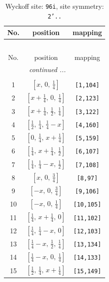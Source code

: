 \documentclass[fleqn,8pt]{jsarticle}
\begin{document}
\begin{longtable}{ccc}
\caption{Wyckoff site: {\tt 96i}, site symmetry: {\tt 2'..}}
 \\
 \hline \hline
No. & position & mapping \\ \hline \endfirsthead

\multicolumn{2}{l}{\tablename\ \thetable{}} \\
 \hline \hline
No. & position & mapping \\ \hline \endhead

 \hline \hline
\multicolumn{2}{r}{\footnotesize\it continued ...} \\ \endfoot

 \hline \hline
\multicolumn{2}{r}{} \\ \endlastfoot

1 & $\left[ x,\, 0,\, \frac{1}{4} \right]$ & {\tt [1,104]} \\ \hline
2 & $\left[ x + \frac{1}{4},\, 0,\, \frac{1}{4} \right]$ & {\tt [2,123]} \\ \hline
3 & $\left[ x + \frac{1}{4},\, \frac{1}{2},\, \frac{1}{4} \right]$ & {\tt [3,122]} \\ \hline
4 & $\left[ \frac{1}{2},\, \frac{1}{4},\, \frac{1}{4} - x \right]$ & {\tt [4,160]} \\ \hline
5 & $\left[ 0,\, \frac{1}{4},\, x + \frac{1}{4} \right]$ & {\tt [5,159]} \\ \hline
6 & $\left[ \frac{1}{4},\, x + \frac{1}{4},\, \frac{1}{2} \right]$ & {\tt [6,107]} \\ \hline
7 & $\left[ \frac{1}{4},\, \frac{1}{4} - x,\, \frac{1}{2} \right]$ & {\tt [7,108]} \\ \hline
8 & $\left[ x,\, 0,\, \frac{3}{4} \right]$ & {\tt [8,97]} \\ \hline
9 & $\left[ - x,\, 0,\, \frac{3}{4} \right]$ & {\tt [9,106]} \\ \hline
10 & $\left[ - x,\, 0,\, \frac{1}{4} \right]$ & {\tt [10,105]} \\ \hline
11 & $\left[ \frac{1}{4},\, x + \frac{1}{4},\, 0 \right]$ & {\tt [11,102]} \\ \hline
12 & $\left[ \frac{1}{4},\, \frac{1}{4} - x,\, 0 \right]$ & {\tt [12,103]} \\ \hline
13 & $\left[ \frac{1}{4} - x,\, \frac{1}{2},\, \frac{1}{4} \right]$ & {\tt [13,134]} \\ \hline
14 & $\left[ \frac{1}{4} - x,\, 0,\, \frac{1}{4} \right]$ & {\tt [14,133]} \\ \hline
15 & $\left[ \frac{1}{2},\, \frac{1}{4},\, x + \frac{1}{4} \right]$ & {\tt [15,149]} \\ \hline

\end{longtable}
\end{document}
